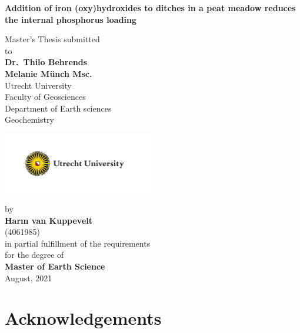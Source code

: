 \documentclass[a4paper,11pt]{article}
\begin{document}
\thispagestyle{empty}
\begin{center}
  {\Large{\bf Addition of iron (oxy)hydroxides to ditches in a peat meadow reduces the internal phosphorus loading}} \vspace{0.5cm}

  Master's Thesis submitted \\\vspace{0.5cm}
  to \\\vspace{0.5cm}
  \textbf{Dr.~Thilo Behrends} \\
  \textbf{Melanie Münch Msc.} \\\vspace{0.5cm}
  Utrecht University \\
  Faculty of Geosciences \\
  Department of Earth sciences \\
   Geochemistry \\  \vspace{1cm}

  \includegraphics[width=0.5\textwidth]{UU_logo_EN_CMYK.png}
  
  by \\\vspace{0.5cm}
  \textbf{Harm van Kuppevelt} \\
  (4061985) \\
  
  \medskip
  \medskip
  in partial fulfillment of the requirements \\
  for the degree of \\
  \textbf{Master of Earth Science} \\\vspace{0.5cm}
  August, 2021
  
\end{center}
\newpage
\hypertarget{acknowledgements}{%
\section*{Acknowledgements}\label{acknowledgements}}
\end{document}
